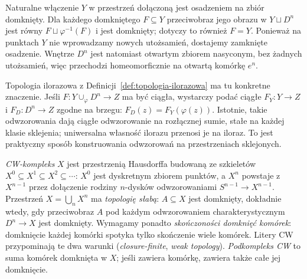 Naturalne włączenie $Y$ w przestrzeń dołączoną jest osadzeniem
na zbiór domknięty. Dla każdego domkniętego $F\subseteq Y$
przeciwobraz jego obrazu w $Y\sqcup D^n$ jest równy
$F\sqcup\varphi^{-1}(F)$ i jest domknięty; dotyczy to również $F=Y$.
Ponieważ na punktach $Y$ nie wprowadzamy nowych utożsamień,
dostajemy zamknięte osadzenie. Wnętrze $D^n$ jest natomiast
otwartym zbiorem nasyconym, bez żadnych utożsamień, więc przechodzi
homeomorficznie na otwartą komórkę $e^n$.

Topologia ilorazowa z
Definicji~\ref{def:topologia-ilorazowa}
ma tu konkretne znaczenie. Jeśli
$F:Y\cup_\varphi D^n\to Z$
ma być ciągła, wystarczy podać
ciągłe $F_Y:Y\to Z$ i
$F_D:D^n\to Z$ zgodne na brzegu:
$F_D(z)=F_Y(\varphi(z))$.
Istotnie, takie odwzorowania dają ciągłe
odwzorowanie na rozłącznej sumie, stałe
na każdej klasie sklejenia;
uniwersalna własność ilorazu
przenosi je na iloraz.
To jest praktyczny sposób
konstruowania odwzorowań na przestrzeniach
sklejonych.

\begin{definicja}[CW-kompleks]
\label{def:cw-kompleks}
\emph{CW-kompleks} $X$ jest przestrzenią Hausdorffa budowaną
ze szkieletów $X^0\subseteq X^1
\subseteq X^2\subseteq\cdots$:
$X^0$ jest dyskretnym zbiorem punktów,
a $X^n$ powstaje z $X^{n-1}$
przez dołączenie rodziny $n$-dysków
odwzorowaniami $S^{n-1}\to X^{n-1}$.
Przestrzeń $X=\bigcup_n X^n$
ma \emph{topologię słabą}:
$A\subseteq X$ jest domknięty,
dokładnie wtedy, gdy przeciwobraz $A$ pod każdym
odwzorowaniem charakterystycznym $D^n\to X$
jest domknięty. Wymagamy ponadto
\emph{skończoności domknięć komórek}:
domknięcie każdej komórki
spotyka tylko skończenie wiele
komórek. Litery CW przypominają
te dwa warunki
(\emph{closure-finite}, \emph{weak topology}).
\emph{Podkompleks CW} to suma komórek
domknięta w $X$; jeśli zawiera komórkę,
zawiera także całe jej domknięcie.
\end{definicja}


